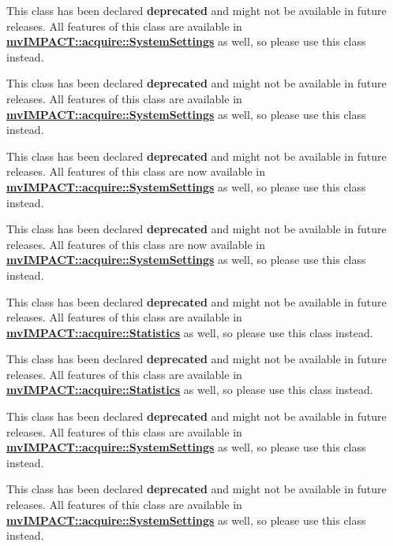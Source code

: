 \begin{DoxyRefList}
This class has been declared {\bfseries deprecated} and might not be available in future releases. All features of this class are available in {\bfseries \hyperlink{classmv_i_m_p_a_c_t_1_1acquire_1_1_system_settings}{mv\+I\+M\+P\+A\+C\+T\+::acquire\+::\+System\+Settings}} as well, so please use this class instead. 

This class has been declared {\bfseries deprecated} and might not be available in future releases. All features of this class are available in {\bfseries \hyperlink{classmv_i_m_p_a_c_t_1_1acquire_1_1_system_settings}{mv\+I\+M\+P\+A\+C\+T\+::acquire\+::\+System\+Settings}} as well, so please use this class instead. 

This class has been declared {\bfseries deprecated} and might not be available in future releases. All features of this class are now available in {\bfseries \hyperlink{classmv_i_m_p_a_c_t_1_1acquire_1_1_system_settings}{mv\+I\+M\+P\+A\+C\+T\+::acquire\+::\+System\+Settings}} as well, so please use this class instead.

This class has been declared {\bfseries deprecated} and might not be available in future releases. All features of this class are now available in {\bfseries \hyperlink{classmv_i_m_p_a_c_t_1_1acquire_1_1_system_settings}{mv\+I\+M\+P\+A\+C\+T\+::acquire\+::\+System\+Settings}} as well, so please use this class instead.

This class has been declared {\bfseries deprecated} and might not be available in future releases. All features of this class are available in {\bfseries \hyperlink{classmv_i_m_p_a_c_t_1_1acquire_1_1_statistics}{mv\+I\+M\+P\+A\+C\+T\+::acquire\+::\+Statistics}} as well, so please use this class instead. 

This class has been declared {\bfseries deprecated} and might not be available in future releases. All features of this class are available in {\bfseries \hyperlink{classmv_i_m_p_a_c_t_1_1acquire_1_1_statistics}{mv\+I\+M\+P\+A\+C\+T\+::acquire\+::\+Statistics}} as well, so please use this class instead. 

This class has been declared {\bfseries deprecated} and might not be available in future releases. All features of this class are available in {\bfseries \hyperlink{classmv_i_m_p_a_c_t_1_1acquire_1_1_system_settings}{mv\+I\+M\+P\+A\+C\+T\+::acquire\+::\+System\+Settings}} as well, so please use this class instead. 

This class has been declared {\bfseries deprecated} and might not be available in future releases. All features of this class are available in {\bfseries \hyperlink{classmv_i_m_p_a_c_t_1_1acquire_1_1_system_settings}{mv\+I\+M\+P\+A\+C\+T\+::acquire\+::\+System\+Settings}} as well, so please use this class instead. 


\end{DoxyRefList}
